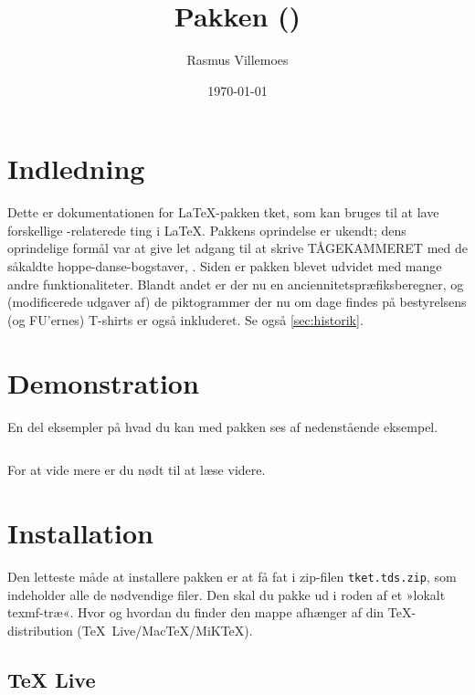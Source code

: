 \documentclass[a4paper,article,oneside,danish]{memoir}
\title{Pakken \ptket (\pTKETVer)}
\author{Rasmus Villemoes}
\date{\today}
\newcommand{\pakkenavn}[1]{\textsf{#1}}
\newcommand{\ptket}{\pakkenavn{tket}\xspace}
\newcommand{\filnavn}[1]{\texttt{#1}}
\newenvironment{resultat}{%
  \begin{adjustwidth}{15mm}{15mm}%
    \begin{qshade}%
    }{%
    \end{qshade}%
  \end{adjustwidth}}
\begin{document}
\maketitle

\tableofcontents*

\section{Indledning}
\label{cha:indledning}

Dette er dokumentationen for \LaTeX-pakken \ptket, som kan bruges til
at lave forskellige \TK-relaterede ting i \LaTeX. Pakkens oprindelse
er ukendt; dens oprindelige formål var at give let adgang til at
skrive \hbox{TÅGEKAMMERET} med de såkaldte hoppe-danse-bogstaver,
\TKET. Siden er pakken blevet udvidet med mange andre
funktionaliteter. Blandt andet er der nu en
anciennitetspræfiksberegner, og (modificerede udgaver af) de
piktogrammer der nu om dage findes på bestyrelsens (og FU'ernes)
T-shirts er også inkluderet. Se også \vref{sec:historik}.

\section{Demonstration}
\label{cha:demonstration}

En del eksempler på hvad du kan med pakken ses af nedenstående
eksempel.
\inputminted{latex}{eksempel-demo.tex}

\begin{resultat}

\end{resultat}

For at vide mere er du nødt til at læse videre.

\section{Installation}
\label{cha:installation}

Den letteste måde at installere pakken er at få fat i zip-filen
\filnavn{tket.tds.zip}, som indeholder alle de nødvendige filer. Den
skal du pakke ud i roden af et »lokalt texmf-træ«. Hvor og hvordan du
finder den mappe afhænger af din \TeX-distribution (\mbox{\TeX{}
  Live}/\mbox{Mac\TeX}/\mbox{MiK\TeX}).

\subsection{\TeX{} Live}
\label{sec:tex-live}
\end{document}
